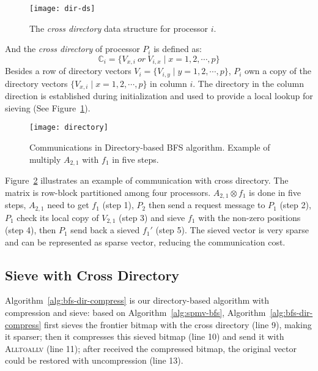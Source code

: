 \documentclass[conference]{IEEEtran}
\begin{document}
\begin{figure}[t]
\centering
  \texttt{[image: dir-ds]}
  \caption{The \textit{cross directory} data structure for processor $i$.}
  \label{fig:dir-ds}
\end{figure}

And the \textit{cross directory} of processor $P_i$ is defined as:
\begin{equation}
  \label{eq:cross-dir}
  \mathbb{C}_i = \{ V_{x,i} \ or\  V_{i,x} \mid x=1,2,\cdots,p \}
\end{equation}
Besides a row of directory vectors $V_i=\{V_{i,y} \mid y=1,2,\cdots,p\}$,
$P_i$ own a copy of the directory vectors $\{V_{x,i} \mid x=1,2,\cdots,p\}$ in
column $i$. The directory in the column direction is established during
initialization and used to provide a local lookup for sieving (See
Figure~\ref{fig:dir-ds}).

\begin{figure}[t]
  \centering
  \texttt{[image: directory]}
  \caption{Communications in Directory-based BFS algorithm. Example of
    multiply $A_{2,1}$ with $f_1$ in five steps.}
  \label{fig:cross-directory}
\end{figure}

Figure~\ref{fig:cross-directory} illustrates an example of
communication with cross directory. The matrix is row-block partitioned among
four processors.
$A_{2,1} \otimes f_1$ is done in five steps, $A_{2,1}$ need to get $f_1$ (step
1), $P_2$ then send a request message to $P_1$ (step 2), $P_1$ check its local
copy of $V_{2,1}$ (step 3) and sieve $f_1$ with the non-zero positions (step
4), then $P_1$ send back a sieved $f_1'$ (step 5). The sieved vector is
very sparse and can be represented as sparse vector, reducing the
communication cost.

\subsection{Sieve with Cross Directory}
\label{sec:dir-bfs-alg}

Algorithm~\ref{alg:bfs-dir-compress} is our directory-based algorithm with
compression and sieve: based on Algorithm~\ref{alg:spmv-bfs},
Algorithm~\ref{alg:bfs-dir-compress} first sieves the frontier bitmap with the
cross directory (line 9), making it sparser; then it compresses this sieved
bitmap (line 10) and send it with \textsc{Alltoallv} (line 11); after received
the compressed bitmap, the original vector could be restored with
uncompression (line 13).
\end{document}
